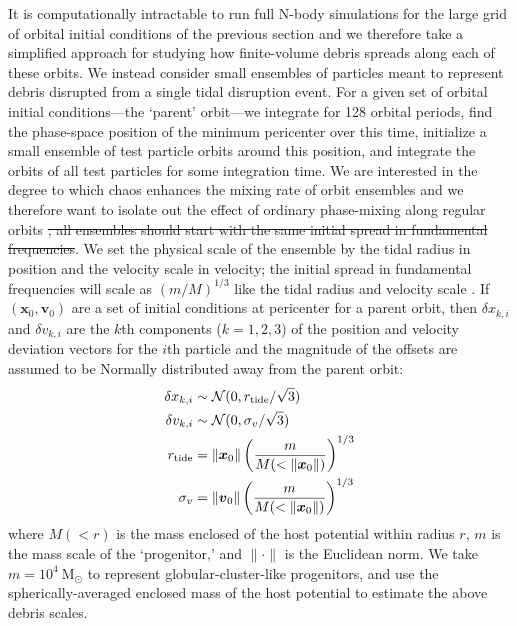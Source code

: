 \documentclass[letterpaper,12pt,preprint]{aastex}
\newcommand{\msun}{\ensuremath{\mathrm{M}_\odot}}
\newcommand{\bs}[1]{\boldsymbol{#1}}
\newcommand{\chchchanges}[1]{{\color{red} {#1}}}
\begin{document}
It is computationally intractable to run full N-body simulations for the large grid of orbital initial conditions of the previous section and we therefore take a simplified approach for studying how finite-volume debris spreads along each of these orbits. We instead consider small ensembles of particles meant to represent debris disrupted from a single tidal disruption event. For a given set of orbital initial conditions---the `parent' orbit---we integrate for 128 orbital periods, find the phase-space position of the minimum pericenter over this time, initialize a small ensemble of test particle orbits around this position, and integrate the orbits of all test particles for some integration time. We are interested in the degree to which chaos enhances the mixing rate of orbit ensembles and we therefore want to isolate out the effect of ordinary phase-mixing along regular orbits\chchchanges{\sout{; all ensembles should start with the same initial spread in fundamental frequencies}}. We set the physical scale of the ensemble by the tidal radius in position and the velocity scale in velocity; the initial spread in fundamental frequencies will scale as $(m/M)^{1/3}$ like the tidal radius and velocity scale \citep[e.g.,][]{johnston98, apw14}. If $(\bs{x}_0,\bs{v}_0)$ are a set of initial conditions at pericenter for a parent orbit, then $\delta x_{k,i}$ and $\delta v_{k,i}$ are the $k$th components ($k=1,2,3$) of the position and velocity deviation vectors for the $i$th particle and the magnitude of the offsets are assumed to be Normally distributed away from the parent orbit:
\begin{align}
	\delta x_{k,i} &\sim \mathcal{N}(0, r_{\rm tide}/\sqrt{3})\\
	\delta v_{k,i} &\sim \mathcal{N}(0, \sigma_v/\sqrt{3})\\
	r_{\rm tide} &= \|\bs{x}_0\| \left(\frac{m}{M(<\|\bs{x}_0\|)}\right)^{1/3} \\
	\sigma_v &= \|\bs{v}_0\|\left(\frac{m}{M(<\|\bs{x}_0\|)}\right)^{1/3} 
\end{align}
where $M(<r)$ is the mass enclosed of the host potential within radius $r$, $m$ is the mass scale of the `progenitor,' and $\|\cdot \|$ is the Euclidean norm. We take $m=10^4~\msun$ to represent globular-cluster-like progenitors, and use the spherically-averaged enclosed mass of the host potential to estimate the above debris scales. %
\end{document}

